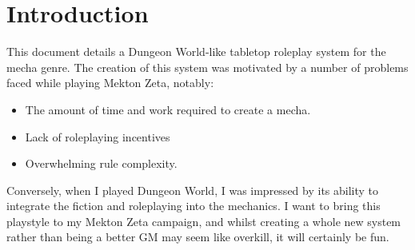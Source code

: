 \section{Introduction}
This document details a Dungeon World-like tabletop roleplay system for the mecha genre. The creation of this system was motivated by a number of problems faced while playing Mekton Zeta, notably:
\begin{itemize}
\item The amount of time and work required to create a mecha.
\item Lack of roleplaying incentives
\item Overwhelming rule complexity.
\end{itemize}

Conversely, when I played Dungeon World, I was impressed by its ability to integrate the fiction and roleplaying into the mechanics. I want to bring this playstyle to my Mekton Zeta campaign, and whilst creating a whole new system rather than being a better GM may seem like overkill, it will certainly be fun.
